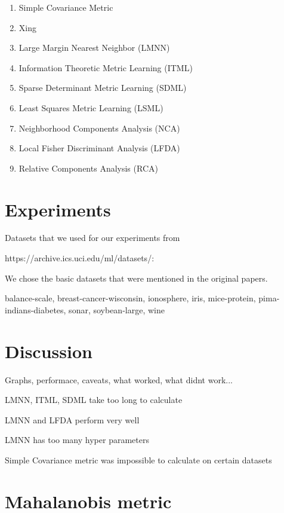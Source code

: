 \documentclass[12pt,a4paper]{report}
\begin{document}
\begin{enumerate}
\item Simple Covariance Metric
\item Xing
\item Large Margin Nearest Neighbor (LMNN)
\item Information Theoretic Metric Learning (ITML)
\item Sparse Determinant Metric Learning (SDML)
\item Least Squares Metric Learning (LSML)
\item Neighborhood Components Analysis (NCA)
\item Local Fisher Discriminant Analysis (LFDA)
\item Relative Components Analysis (RCA)
\end{enumerate}


\chapter{Experiments}

Datasets that we used for our experiments from 

https://archive.ics.uci.edu/ml/datasets/:

We chose the basic datasets that were mentioned in the original papers.

balance-scale, breast-cancer-wisconsin, ionosphere, iris, mice-protein, pima-indians-diabetes, sonar, soybean-large, wine


\chapter{Discussion}

Graphs, performace, caveats, what worked, what didnt work...

LMNN, ITML, SDML take too long to calculate

LMNN and LFDA perform very well

LMNN has too many hyper parameters

Simple Covariance metric was impossible to calculate on certain datasets


\chapter{Mahalanobis metric}
\end{document}
